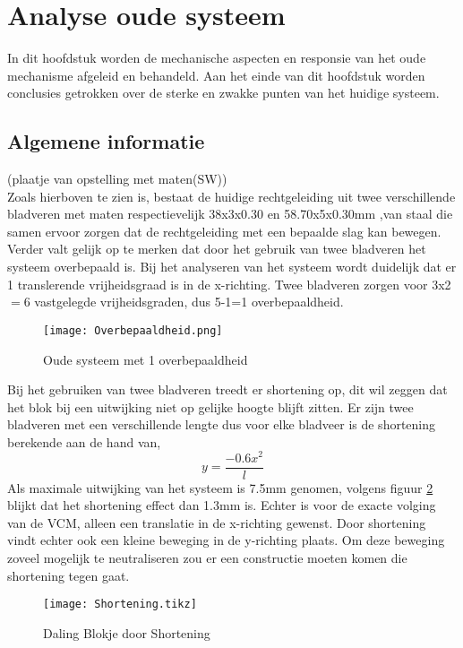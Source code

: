 \documentclass[a4paper]{article}
\begin{document}
\section{Analyse oude systeem}
In dit hoofdstuk worden de mechanische aspecten en responsie van het oude mechanisme afgeleid en behandeld. Aan het einde van dit hoofdstuk worden conclusies getrokken over de sterke en zwakke punten van het huidige systeem.

\subsection{Algemene informatie}
(plaatje van opstelling met maten(SW)) \\
Zoals hierboven te zien is, bestaat de huidige rechtgeleiding uit twee verschillende bladveren met maten respectievelijk 38x3x0.30 en 58.70x5x0.30mm ,van staal die samen ervoor zorgen dat de rechtgeleiding met een bepaalde slag kan bewegen. Verder valt gelijk op te merken dat door het gebruik van twee bladveren het systeem overbepaald is. Bij het analyseren van het systeem wordt duidelijk dat er 1  translerende vrijheidsgraad is in de x-richting. Twee bladveren zorgen voor 3x2$=$6 vastgelegde vrijheidsgraden, dus 5-1=1 overbepaaldheid. 

\begin{figure}[h]
\label{Overbepaaldheid}
\centering
\setlength\figureheight{5cm}
\setlength{}
\texttt{[image: Overbepaaldheid.png]}
\caption{Oude systeem met 1 overbepaaldheid}
\end{figure}


Bij het gebruiken van twee bladveren treedt er shortening op, dit wil zeggen dat het blok bij een uitwijking niet op gelijke hoogte blijft zitten. Er zijn twee bladveren met een verschillende lengte dus voor elke bladveer is de shortening berekende aan de hand van,
\begin{equation}
y=\frac{-0.6x^2}{l}
\end{equation}
Als maximale uitwijking van het systeem is 7.5mm genomen, volgens figuur \ref{Shortening} blijkt dat het shortening effect dan 1.3mm is. Echter is voor de exacte volging van de VCM, alleen een translatie in de x-richting gewenst. Door shortening vindt echter ook een kleine beweging in de y-richting plaats. Om deze beweging zoveel mogelijk te neutraliseren zou er een constructie moeten komen die shortening tegen gaat. 
\begin{figure}[h]
\label{Shortening}
\centering
\setlength\figureheight{5cm}
\setlength{}
\texttt{[image: Shortening.tikz]}
\caption{Daling Blokje door Shortening}
\end{figure}
\end{document}
